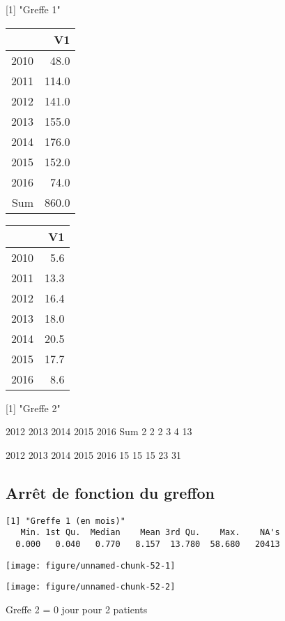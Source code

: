 \documentclass[11pt,a4paper]{article}\usepackage[]{graphicx}\usepackage[]{color}
\makeatletter
\def\maxwidth{ %
  \ifdim\Gin@nat@width>\linewidth
    \linewidth
  \else
    \Gin@nat@width
  \fi
}
\newenvironment{kframe}{%
 \def\at@end@of@kframe{}%
 \ifinner\ifhmode%
  \def\at@end@of@kframe{\end{minipage}}%
  \begin{minipage}{\columnwidth}%
 \fi\fi%
 \def\FrameCommand##1{\hskip\@totalleftmargin \hskip-\fboxsep
 \colorbox{shadecolor}{##1}\hskip-\fboxsep
     \hskip-\linewidth \hskip-\@totalleftmargin \hskip\columnwidth}%
 \MakeFramed {\advance\hsize-\width
   \@totalleftmargin\z@ \linewidth\hsize
   \@setminipage}}%
 {\par\unskip\endMakeFramed%
 \at@end@of@kframe}
\newenvironment{knitrout}{}{} %
\makeatother
\begin{document}
[1] "Greffe 1"
\begin{table}[H]
\centering
\begin{tabular}{rr}
  \hline
 & V1 \\ 
  \hline
2010 & 48.0 \\ 
  2011 & 114.0 \\ 
  2012 & 141.0 \\ 
  2013 & 155.0 \\ 
  2014 & 176.0 \\ 
  2015 & 152.0 \\ 
  2016 & 74.0 \\ 
  Sum & 860.0 \\ 
   \hline
\end{tabular}
\end{table}
\begin{table}[H]
\centering
\begin{tabular}{rr}
  \hline
 & V1 \\ 
  \hline
2010 & 5.6 \\ 
  2011 & 13.3 \\ 
  2012 & 16.4 \\ 
  2013 & 18.0 \\ 
  2014 & 20.5 \\ 
  2015 & 17.7 \\ 
  2016 & 8.6 \\ 
   \hline
\end{tabular}
\end{table}
[1] "Greffe 2"

2012 2013 2014 2015 2016  Sum 
   2    2    2    3    4   13 

2012 2013 2014 2015 2016 
  15   15   15   23   31 



  \subsection{Arrêt de fonction du greffon}
  
\begin{knitrout}
\color{fgcolor}\begin{kframe}
\begin{verbatim}
[1] "Greffe 1 (en mois)"
   Min. 1st Qu.  Median    Mean 3rd Qu.    Max.    NA's 
  0.000   0.040   0.770   8.157  13.780  58.680   20413 
\end{verbatim}
\end{kframe}
\texttt{[image: figure/unnamed-chunk-52-1]} 

\texttt{[image: figure/unnamed-chunk-52-2]} 

\end{knitrout}
Greffe 2 = 0 jour pour 2 patients
~\\
\end{document}
